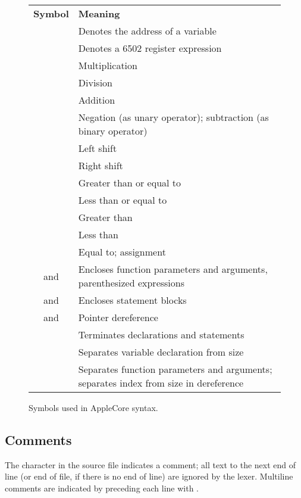 \documentclass[10pt]{article}
\begin{document}
\begin{figure}[th]
\begin{center}
\begin{tabular}{c l}
\textbf{Symbol} & \textbf{Meaning} \\
%
\kwd{@} & Denotes the address of a variable \\
%
\kwd{\^} & Denotes a 6502 register expression \\
\kwd{*}  & Multiplication \\
\kwd{/}  & Division \\
\kwd{+}  & Addition \\
\kwd{-}  & Negation (as unary operator); subtraction (as binary
operator) \\
\kwd{<<} & Left shift \\
\kwd{>>} & Right shift \\
\kwd{>=} & Greater than or equal to \\
\kwd{<=} & Less than or equal to \\
\kwd{>}  & Greater than \\
\kwd{<}  & Less than \\
\kwd{=}  & Equal to; assignment \\
\kwd{(} and \kwd{)} & Encloses function parameters and arguments, parenthesized expressions
\\
\kwd{\{} and \kwd{\}} & Encloses statement blocks \\
\kwd{[} and \kwd{]} & Pointer dereference \\
\kwd{;} & Terminates declarations and statements \\
\kwd{:} & Separates variable declaration from size \\
\kwd{,} & Separates function parameters and arguments; separates index from size in dereference \\
\end{tabular}
\end{center}
\caption{Symbols used in AppleCore syntax.}
\label{fig:symbols}
\end{figure}

\subsection{Comments}
\label{sec:lexical:comments}

The character \kwd{\#} in the source file indicates a comment; all
text to the next end of line (or end of file, if there is no end of
line) are ignored by the lexer.  Multiline comments are indicated by
preceding each line with \kwd{\#}.
\end{document}
